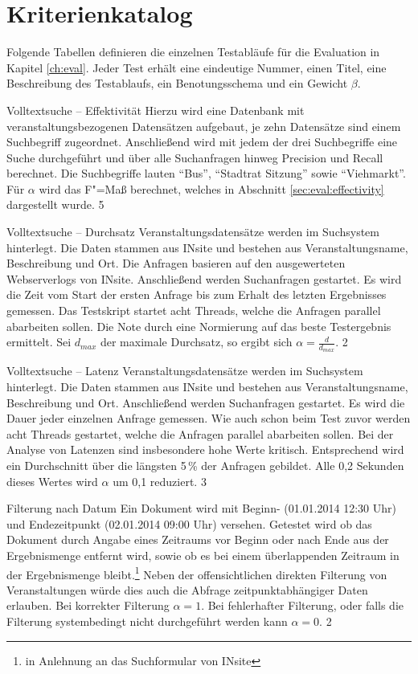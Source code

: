 \chapter{Kriterienkatalog}
\label{ch:test_Definition}
Folgende Tabellen definieren die einzelnen Testabläufe für die Evaluation in Kapitel \ref{ch:eval}. Jeder Test erhält eine eindeutige Nummer, einen Titel, eine Beschreibung des Testablaufs, ein Benotungsschema und ein Gewicht $\beta$.

\myTestDefinition
{Volltextsuche -- Effektivität}
{
Hierzu wird eine Datenbank mit  veranstaltungsbezogenen Datensätzen aufgebaut, je zehn Datensätze sind einem Suchbegriff zugeordnet. Anschließend wird mit jedem der drei Suchbegriffe eine Suche durchgeführt und über alle Suchanfragen hinweg Precision und Recall berechnet. Die Suchbegriffe lauten \enquote{Bus}, \enquote{Stadtrat Sitzung} sowie \enquote{Viehmarkt}.
}
{Für $\alpha$ wird das F"=Maß berechnet, welches in Abschnitt \ref{sec:eval:effectivity} dargestellt wurde.}
{5}

\myTestDefinition
{Volltextsuche -- Durchsatz}
{
 Veranstaltungsdatensätze werden im Suchsystem hinterlegt. Die Daten stammen aus INsite und bestehen aus Veranstaltungsname, Beschreibung und Ort. Die Anfragen basieren auf den ausgewerteten Webserverlogs von INsite. Anschließend werden  Suchanfragen gestartet. Es wird die Zeit vom Start der ersten Anfrage bis zum Erhalt des letzten Ergebnisses gemessen. Das Testskript startet acht Threads, welche die  Anfragen parallel abarbeiten sollen.
}
{
Die Note durch eine Normierung auf das beste Testergebnis ermittelt. Sei $d_{max}$ der maximale Durchsatz, so ergibt sich $\alpha = \frac{d}{d_{max}}$.
}
{2}

\myTestDefinition
{Volltextsuche -- Latenz}
{
 Veranstaltungsdatensätze werden im Suchsystem hinterlegt. Die Daten stammen aus INsite und bestehen aus Veranstaltungsname, Beschreibung und Ort. Anschließend werden  Suchanfragen gestartet. Es wird die Dauer jeder einzelnen Anfrage gemessen. Wie auch schon beim Test zuvor werden acht Threads gestartet, welche die  Anfragen parallel abarbeiten sollen.
}
{
Bei der Analyse von Latenzen sind insbesondere hohe Werte kritisch. Entsprechend wird ein Durchschnitt über die längsten 5\,\% der Anfragen gebildet. Alle 0,2 Sekunden dieses Wertes wird $\alpha$ um 0,1 reduziert.
}
{3}

\myTestDefinition
{Filterung nach Datum}
{
Ein Dokument wird mit Beginn- (01.01.2014 12:30 Uhr) und Endezeitpunkt (02.01.2014 09:00 Uhr) versehen. Getestet wird ob das Dokument durch Angabe eines Zeitraums vor Beginn oder nach Ende aus der Ergebnismenge entfernt wird, sowie ob es bei einem überlappenden Zeitraum in der Ergebnismenge bleibt.\footnote{in Anlehnung an das Suchformular von INsite}} Neben der offensichtlichen direkten Filterung von Veranstaltungen würde dies auch die Abfrage zeitpunktabhängiger Daten erlauben.
{Bei korrekter Filterung $\alpha = 1$. Bei fehlerhafter Filterung, oder falls die Filterung systembedingt nicht durchgeführt werden kann $\alpha = 0$.}
{2}


